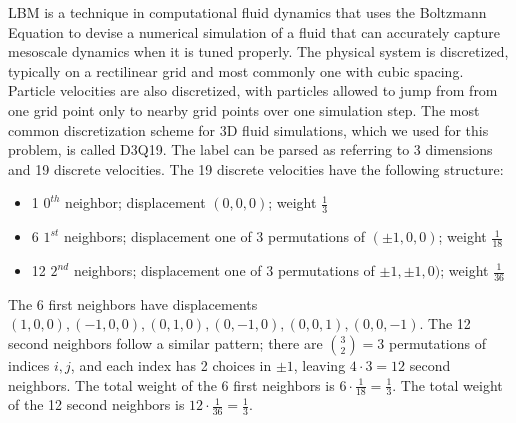 \documentclass[11pt]{article} %
\begin{document}
LBM is a technique in computational fluid dynamics that uses the Boltzmann Equation
to devise a numerical simulation of a fluid that can accurately capture mesoscale dynamics
when it is tuned properly.
The physical system is discretized, typically on a rectilinear grid 
and most commonly one with cubic spacing.  
Particle velocities are also discretized, with particles allowed to jump from
from one grid point only to nearby grid points over one simulation step.
The most common discretization scheme for 3D fluid simulations,
which we used for this problem, is called D3Q19.
The label can be parsed as referring to 3 dimensions and 19 discrete velocities.
The 19 discrete velocities have the following structure:
\begin{itemize}
\item 1 $0^{th}$ neighbor; displacement $(0,0,0)$; weight $\frac{1}{3}$
\item 6 $1^{st}$ neighbors; displacement one of 3 permutations of $(\pm 1, 0, 0)$; weight $\frac{1}{18}$
\item 12 $2^{nd}$ neighbors; displacement one of 3 permutations of $\pm 1, \pm 1, 0)$; weight $\frac{1}{36}$
\end{itemize}
The 6 first neighbors have displacements $(1,0,0), (-1,0,0), (0,1,0), (0,-1,0), (0,0,1), (0,0,-1)$.
The 12 second neighbors follow a similar pattern; there are ${3 \choose 2} = 3$ permutations of indices
$i, j$, and each index has 2 choices in $\pm1$, leaving $4 \cdot 3 = 12$ second neighbors.
The total weight of the 6 first neighbors is $6 \cdot \frac{1}{18} = \frac{1}{3}$.
The total weight of the 12 second neighbors is $12 \cdot \frac{1}{36} = \frac{1}{3}$.
\end{document}

